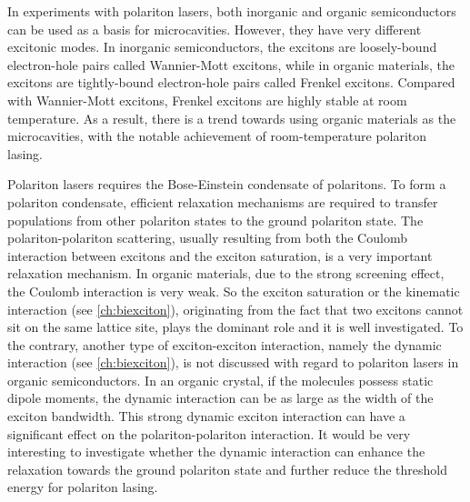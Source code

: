 In experiments with polariton lasers, both inorganic and organic semiconductors can be used as a basis for 
microcavities\cite{pavlos2014}. However, they have very different excitonic modes. In inorganic semiconductors, the 
excitons are  loosely-bound electron-hole pairs called Wannier-Mott excitons, while in organic materials, the excitons are 
tightly-bound electron-hole pairs called Frenkel excitons. Compared with Wannier-Mott excitons, Frenkel excitons are highly
stable at room temperature\cite{lidzey395}. As a result, there is a trend towards using organic materials as the 
microcavities\cite{pavlos2014}, with the notable achievement of room-temperature polariton lasing\cite{plumhof2014, 
daskalakis2014}.

Polariton lasers requires the Bose-Einstein condensate of polaritons. To form a polariton condensate,  efficient 
relaxation mechanisms are required to transfer populations from other polariton states to the ground polariton state.  
The polariton-polariton scattering\cite{ciuti1998, tassone1999}, usually resulting from both the Coulomb interaction between 
excitons and the exciton saturation,  is a very important relaxation mechanism. In organic materials, due to the strong 
screening effect, the Coulomb interaction is very weak. So the exciton saturation or the kinematic interaction (see \autoref{ch:biexciton}), originating from the fact that two excitons
cannot sit on the same lattice site, plays the dominant role and it is well investigated\cite{zoubiKinematic, litinskaya2008, 
bittner2012}. 
To the contrary, another type of exciton-exciton interaction, namely the dynamic interaction (see \autoref{ch:biexciton}), is not discussed with regard to polariton lasers in organic semiconductors. In an organic crystal, if the molecules possess static dipole 
moments, the dynamic interaction can be as large as the width of the exciton bandwidth\cite{agranovich}. This strong 
 dynamic exciton interaction can have a significant effect on the polariton-polariton interaction. It would be very interesting
 to investigate whether the dynamic interaction can enhance the relaxation towards the ground polariton
 state and further reduce the threshold energy for polariton lasing. 
 
